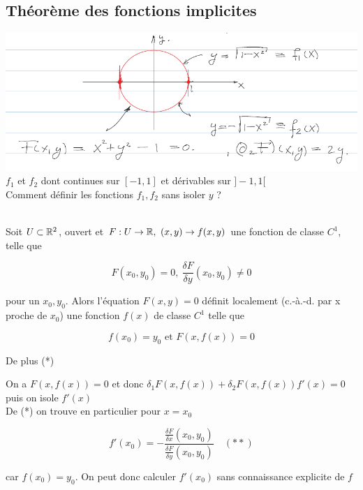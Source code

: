 \documentclass[12pt,a4paper]{article}
\begin{document}
\subsection{Théorème des fonctions implicites}
\includegraphics[scale=0.5]{images/fonctions_implicites}\\
$f_1$ et $f_2$ dont continues sur $[-1,1]$ et dérivables sur $]-1,1[$\\
Comment définir les fonctions $f_1,f_2$ sans isoler $y$ ?
\begin{boite}
	\\
	Soit $U \subset \mathbb{R}^2$, ouvert et $F : U \to \mathbb{R},\ (x,y) \to f(x,y)$ une fonction de classe $C^1$, telle que
	\begin{boite}
	\begin{equation*}
			F(x_0,y_0) = 0,\ \frac{\delta F}{\delta y}(x_0,y_0) \neq 0
	\end{equation*}
	\end{boite}
	pour un $x_0,y_0$. Alors l'équation $F(x,y) = 0$ définit localement (c.-à.-d. par x proche de $x_0$) une fonction $f(x)$ de classe $C^1$ telle que 
	\begin{boite}
	\begin{equation*}
			f(x_0) = y_0 \text{ et } F(x,f(x)) = 0
	\end{equation*}
	\end{boite}
	De plus 
	(*)
\end{boite}
 On a $F(x,f(x)) = 0$ et donc $\delta_1 F(x,f(x)) + \delta_2 F(x,f(x))f'(x) = 0$ puis on isole $f'(x)$\\
De (*) on trouve en particulier pour $x=x_0$
\begin{boite}[0.6]
\begin{equation*}
		f'(x_0) = -\frac{\frac{\delta F}{\delta x} (x_0,y_0)}{\frac{\delta F}{\delta y}	(x_0,y_0)}\quad (**)
\end{equation*}
\end{boite}
car $f(x_0) = y_0$. On peut donc calculer $f'(x_0)$ sans connaissance explicite de $f$
\end{document}
